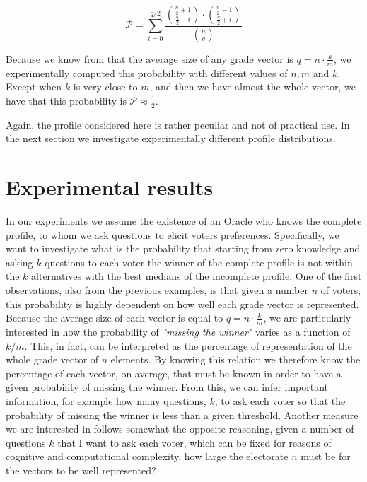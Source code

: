 \begin{example}
		\[ \mathcal{P}= \sum_{i=0}^{q/2} \frac{\binom{\frac{n}{2}+1}{ \frac{q}{2}-i}\cdot\binom{\frac{n}{2}-1}{\frac{q}{2}+i}}{\binom{n}{q}} \]
		
		Because we know from  that the average size of any grade vector is $q=n\cdot\frac{k}{m}$, we experimentally computed this probability with different values of $n,m$ and $k$. Except when $k$ is very close to $m$, and then we have almost the whole vector, we have that this probability is $\mathcal{P}\approx \frac{1}{2}$.
	\end{example}

	Again, the profile considered here is rather peculiar and not of practical use. In the next section we investigate experimentally different profile distributions.


\section{Experimental results}
	
	In our experiments we assume the existence of an Oracle who knows the complete profile, to whom we ask questions to elicit voters preferences. Specifically, we want to investigate what is the probability that starting from zero knowledge and asking $k$ questions to each voter the winner of the complete profile is not within the $k$ alternatives with the best medians of the incomplete profile.
	One of the first observations, also from the previous examples, is that given a number $n$ of voters, this probability is highly dependent on how well each grade vector is represented.
	Because the average size of each vector is equal to $q=n\cdot\frac{k}{m}$, we are particularly interested in how the probability of \textit{"missing the winner"} varies as a function of $k/m$. This, in fact, can be interpreted as the percentage of representation of the whole grade vector of $n$ elements. By knowing this relation we therefore know the percentage of each vector, on average, that must be known in order to have a given probability of missing the winner. From this, we can infer important information, for example how many questions, $k$, to ask each voter so that the probability of missing the winner is less than a given threshold.
	Another measure we are interested in follows somewhat the opposite reasoning, given a number of questions $k$ that I want to ask each voter, which can be fixed for reasons of cognitive and computational complexity, how large the electorate $n$ must be for the vectors to be well represented?
	
